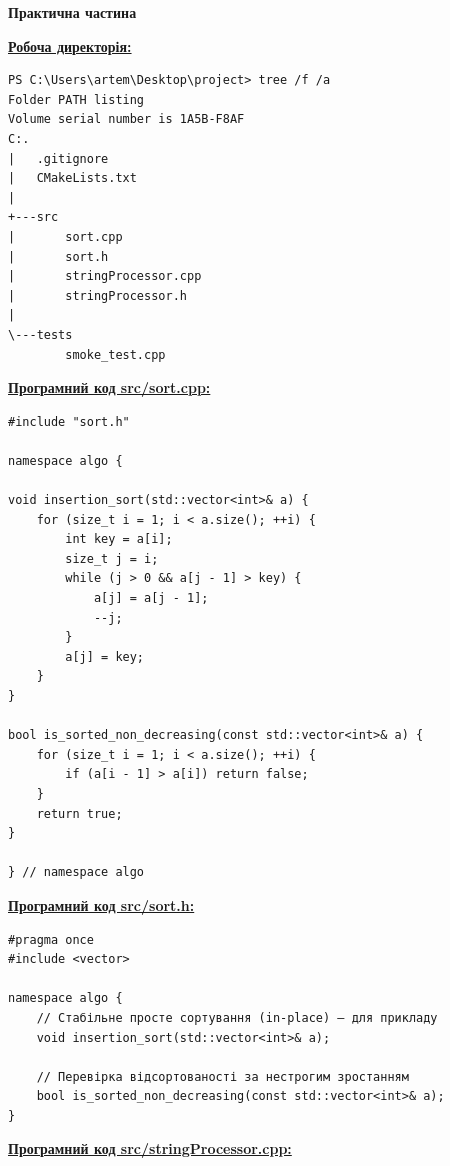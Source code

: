 \documentclass[12pt,a4paper]{article}
\begin{document}
    \vspace{1em}

    \begin{center} \textbf{\Large Практична частина} \end{center}

    \textbf{\underline{Робоча директорія:}}

    \begin{verbatim}
PS C:\Users\artem\Desktop\project> tree /f /a 
Folder PATH listing
Volume serial number is 1A5B-F8AF
C:.
|   .gitignore
|   CMakeLists.txt
|   
+---src
|       sort.cpp
|       sort.h
|       stringProcessor.cpp
|       stringProcessor.h
|       
\---tests
        smoke_test.cpp
    \end{verbatim}

    \textbf{\underline{Програмний код src/sort.cpp:}}

    \begin{verbatim}
#include "sort.h"

namespace algo {

void insertion_sort(std::vector<int>& a) {
    for (size_t i = 1; i < a.size(); ++i) {
        int key = a[i];
        size_t j = i;
        while (j > 0 && a[j - 1] > key) {
            a[j] = a[j - 1];
            --j;
        }
        a[j] = key;
    }
}

bool is_sorted_non_decreasing(const std::vector<int>& a) {
    for (size_t i = 1; i < a.size(); ++i) {
        if (a[i - 1] > a[i]) return false;
    }
    return true;
}

} // namespace algo
    \end{verbatim}

    \newpage

    \textbf{\underline{Програмний код src/sort.h:}}

    \begin{verbatim}
#pragma once
#include <vector>

namespace algo {
    // Стабільне просте сортування (in-place) — для прикладу
    void insertion_sort(std::vector<int>& a);

    // Перевірка відсортованості за нестрогим зростанням
    bool is_sorted_non_decreasing(const std::vector<int>& a);
}
    \end{verbatim}

    \textbf{\underline{Програмний код src/stringProcessor.cpp:}}
\end{document}
